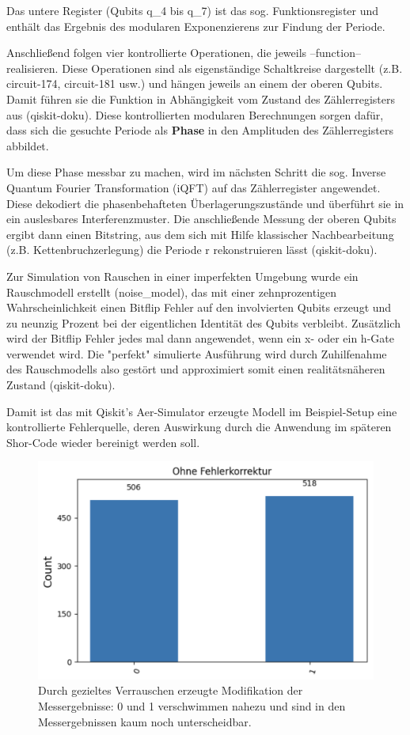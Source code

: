 Das untere Register (Qubits q\_4 bis q\_7) ist das sog. Funktionsregister und enthält das Ergebnis des modularen Exponenzierens zur Findung der Periode.

Anschließend folgen vier kontrollierte Operationen, die jeweils --function-- realisieren. Diese Operationen sind als eigenständige Schaltkreise dargestellt (z.B. circuit-174, circuit-181 usw.) und hängen jeweils an einem der oberen Qubits. Damit führen sie die Funktion in Abhängigkeit vom Zustand des Zählerregisters aus (qiskit-doku). Diese kontrollierten modularen Berechnungen sorgen dafür, dass sich die gesuchte Periode als \textbf{Phase} in den Amplituden des Zählerregisters abbildet.

Um diese Phase messbar zu machen, wird im nächsten Schritt die sog. Inverse Quantum Fourier Transformation (iQFT) auf das Zählerregister angewendet. Diese dekodiert die phasenbehafteten Überlagerungszustände und überführt sie in ein auslesbares Interferenzmuster. Die anschließende Messung der oberen Qubits ergibt dann einen Bitstring, aus dem sich mit Hilfe klassischer Nachbearbeitung (z.B. Kettenbruchzerlegung) die Periode r rekonstruieren lässt (qiskit-doku).

Zur Simulation von Rauschen in einer imperfekten Umgebung wurde ein Rauschmodell erstellt (noise\_model), das mit einer zehnprozentigen Wahrscheinlichkeit einen Bitflip Fehler auf den involvierten Qubits erzeugt und zu neunzig Prozent bei der eigentlichen Identität des Qubits verbleibt.
Zusätzlich wird der Bitflip Fehler jedes mal dann angewendet, wenn ein x- oder ein h-Gate verwendet wird.
Die "perfekt" simulierte Ausführung wird durch Zuhilfenahme des Rauschmodells also gestört und approximiert somit einen realitätsnäheren Zustand (qiskit-doku).

Damit ist das mit Qiskit's Aer-Simulator erzeugte Modell im Beispiel-Setup eine kontrollierte Fehlerquelle, deren Auswirkung durch die Anwendung im späteren Shor-Code wieder bereinigt werden soll.

\begin{figure}
    \centering
    \includegraphics[width=0.75\linewidth]{images/praxis-example/result_m_ec.png}
    \caption{Durch gezieltes Verrauschen erzeugte Modifikation der Messergebnisse: 0 und 1 verschwimmen nahezu und sind in den Messergebnissen kaum noch unterscheidbar.}
    \label{fig:modified_results}
\end{figure}

